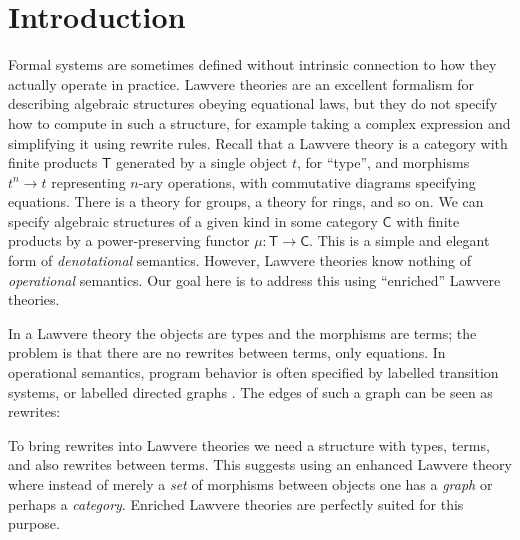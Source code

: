 \documentclass{amsart}
\theoremstyle{definition}
\newcommand{\C}{\mathsf{C}}
\newcommand{\T}{\mathsf{T}}
\newcommand{\maps}{\colon}
\begin{document}
\section{Introduction}


Formal systems are sometimes defined without intrinsic connection to how they actually operate in practice.   Lawvere theories  \cite{lawvere} are an excellent formalism for describing algebraic structures obeying equational laws, but they do not specify how to compute in such a structure, for example taking a complex expression and simplifying it using rewrite rules.   Recall that a Lawvere theory is a category with finite products $\T$ generated by a single object $t$, for ``type'', and morphisms $t^n \to t$ representing $n$-ary operations, with commutative diagrams specifying equations.   There is a theory for groups, a theory for rings, and so on.   We can specify algebraic structures of a given kind in some category $\C$ with finite products by a power-preserving functor $\mu \maps\T \to \C$.   This is a simple and elegant form of \emph{denotational} semantics.    However, Lawvere theories know nothing of \emph{operational} semantics.  Our goal here is to address this using ``enriched'' Lawvere theories.

In a Lawvere theory the objects are types and the morphisms are terms; the problem is that
there are no rewrites between terms, only equations.   In operational semantics, program behavior is often specified by labelled transition systems, or labelled directed graphs \cite{sos}.  The edges of such a graph can be seen as rewrites:
\begin{center}\end{center}
To bring rewrites into Lawvere theories we need a structure with types, terms, and also rewrites
between terms.   This suggests using an enhanced Lawvere theory where instead of merely
a \emph{set} of morphisms between objects one has a \emph{graph} or perhaps a \emph{category}. Enriched Lawvere theories are perfectly suited for this purpose.
\end{document}
